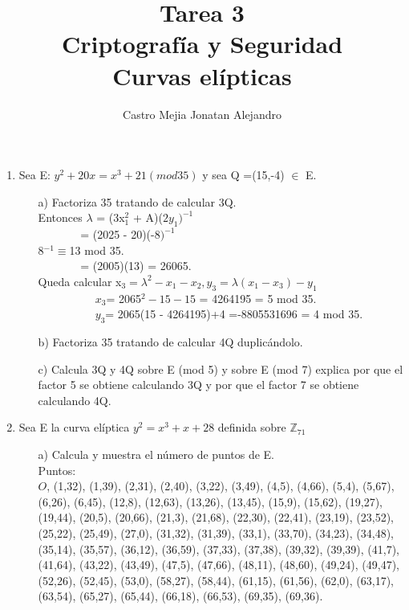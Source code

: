 \documentclass[10pt,a4paper]{article}
\author{Castro Mejia Jonatan Alejandro}
\title{Tarea 3 \\Criptografía y Seguridad \\ Curvas elípticas}
\begin{document}
\maketitle
\begin{enumerate}
\item Sea E: $y^{2}+20x= x^{3}+21(mod 35)$ y sea Q =(15,-4) $\in$ E.
\begin{itemize}
\item[a)] Factoriza 35 tratando de calcular 3Q.
\\Entonces $\lambda$ = (3x$_{1}^{2}$ + A)($2y_{1})^{-1}$
\\$~~~~~~~~~~~~~~~~~$= (2025 - 20)(-8$)^{-1}$
\\8$^{-1} \equiv $13 mod 35.
\\$~~~~~~~~~~~~~~~~~$= (2005)(13) =  26065.
\\Queda calcular x$_{3} = \lambda ^{2} - x_{1}- x_{2}, y_{3}= \lambda(x_{1}-x_{3})-y_{1}$
\\$~~~~~~~~~~~~~~~~~~~~~~~x_{3}$= 2065$^{2} - 15- 15$ = 4264195 = 5 mod 35.
\\$~~~~~~~~~~~~~~~~~~~~~~~y_{3}$= 2065(15 - 4264195)+4 =-8805531696 = 4 mod 35.
\item[b)] Factoriza 35 tratando de calcular 4Q duplicándolo.
\item[c)] Calcula 3Q y 4Q sobre E (mod 5) y sobre E (mod 7) explica por que el factor 5 se obtiene calculando 3Q y por que el factor 7 se obtiene calculando 4Q.

\end{itemize}
\item Sea E la curva elíptica $y^{2} =x^{3}+x+28 $ definida sobre $\mathbb{Z}_{71}$
\begin{itemize}
\item[a)] Calcula y muestra el número de puntos de E.\\
Puntos:\\ $O$, (1,32),
(1,39),
(2,31),
(2,40),
(3,22),
(3,49),
(4,5),
(4,66),
(5,4),
(5,67),
(6,26),
(6,45),
(12,8),
(12,63),
(13,26),
(13,45),
(15,9),
(15,62),
(19,27),
(19,44),
(20,5),
(20,66),
(21,3),
(21,68),
(22,30),
(22,41),
(23,19),
(23,52),
(25,22),
(25,49),
(27,0),
(31,32),
(31,39),
(33,1),
(33,70),
(34,23),
(34,48),
(35,14),
(35,57),
(36,12),
(36,59),
(37,33),
(37,38),
(39,32),
(39,39),
(41,7),
(41,64),
(43,22),
(43,49),
(47,5),
(47,66),
(48,11),
(48,60),
(49,24),
(49,47),
(52,26),
(52,45),
(53,0),
(58,27),
(58,44),
(61,15),
(61,56),
(62,0),
(63,17),
(63,54),
(65,27),
(65,44),
(66,18),
(66,53),
(69,35),
(69,36).



\end{itemize}
\end{enumerate}
\end{document}
